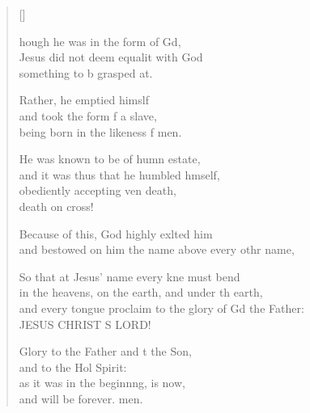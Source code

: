 \settowidth{\versewidth}{and every tongue proclaim to the glory of God the Father: *}
\begin{verse}[\versewidth]
  \begin{patverse}
    hough he was in the form of Gd,\Flex\\
    Jesus did not deem equalit with God\Med\\
    something to b grasped at.
    
    Rather, he emptied himslf\Flex\\
    and took the form f a slave,\Med\\
    being born in the likeness f men.
    
    He was known to be of humn estate,\Med\\
    and it was thus that he humbled h\pointup{\i}mself,\\
    obediently accepting ven death,\Med\\
    death on  cross!
    
    Because of this, God highly exlted him\Med\\
    and bestowed on him the name above every othr name,
    
    So that at Jesus’ name every kne must bend\Med\\
    in the heavens, on the earth, and under th earth,\\
    and every tongue proclaim to the glory of Gd the Father:\Med\\
    JESUS CHRIST S LORD!

    Glory to the Father and t the Son,\Med\\
    and to the Hol Spirit:\\
    as it was in the beginn\pointup{\i}ng, is now,\Med\\
    and will be forever. men.
  \end{patverse}
\end{verse}
